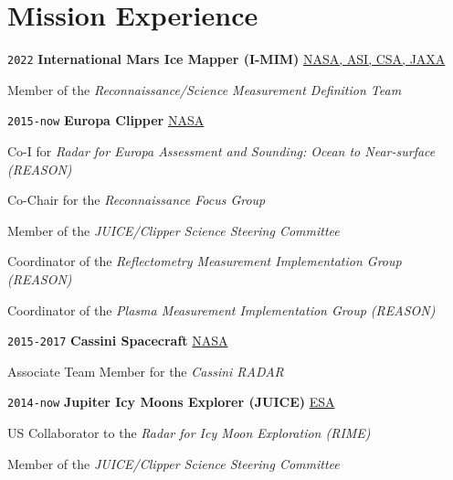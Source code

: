 \section*{Mission Experience}

\TabPositions{6em,31em}

\noindent \texttt{2022} \tab \textbf{International Mars Ice Mapper (I-MIM)} \tab
\href{https://europa.nasa.gov/}{NASA, ASI, CSA, JAXA}
\begin{adjustwidth}{2.5em}{}
Member of the \textit{Reconnaissance/Science Measurement Definition Team}
\end{adjustwidth}
\vspace{.5em}

\noindent \texttt{2015-now} \tab \textbf{Europa Clipper} \tab
\href{https://europa.nasa.gov/}{NASA}
\begin{adjustwidth}{2.5em}{}
Co-I for \textit{Radar for Europa Assessment and Sounding: Ocean to Near-surface (REASON)}
\end{adjustwidth}
\begin{adjustwidth}{2.5em}{}
Co-Chair for the \textit{Reconnaissance Focus Group}
\end{adjustwidth}
\begin{adjustwidth}{2.5em}{}
Member of the \textit{JUICE/Clipper Science Steering Committee}
\end{adjustwidth}
\begin{adjustwidth}{2.5em}{}
Coordinator of the \textit{Reflectometry Measurement Implementation Group (REASON)}
\end{adjustwidth}
\begin{adjustwidth}{2.5em}{}
Coordinator of the \textit{Plasma Measurement Implementation Group (REASON)}
\end{adjustwidth}
\vspace{.5em}

\noindent \texttt{2015-2017} \tab \textbf{Cassini Spacecraft} \tab
\href{https://www.nasa.gov/mission_pages/cassini/main/index.html}{NASA}
\begin{adjustwidth}{2.5em}{}
Associate Team Member for the \textit{Cassini RADAR}
\end{adjustwidth}
\vspace{.5em}

\noindent \texttt{2014-now} \tab \textbf{Jupiter Icy Moons Explorer (JUICE)} \tab
\href{https://sci.esa.int/web/juice}{ESA}
\begin{adjustwidth}{2.5em}{}
US Collaborator to the \textit{Radar for Icy Moon Exploration (RIME)}
\end{adjustwidth}
\begin{adjustwidth}{2.5em}{}
Member of the \textit{JUICE/Clipper Science Steering Committee}
\end{adjustwidth}
\vspace{.5em}

